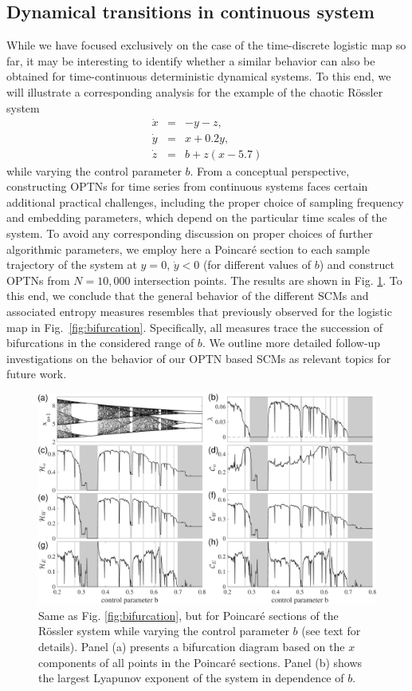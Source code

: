 \documentclass[12pt,aip,cha,reprint,nofootinbib]{revtex4-1}
\begin{document}
\subsection{Dynamical transitions in continuous system}\label{sec:cont}

While we have focused exclusively on the case of the time-discrete logistic map so far, it may be interesting to identify whether a similar behavior can also be obtained for time-continuous deterministic dynamical systems. To this end, we will illustrate a corresponding analysis for the example of the chaotic R\"ossler system \cite{Roessler1976} 
\begin{eqnarray}
\dot{x} &=& -y-z, \nonumber \\
\dot{y} &=& x+0.2y, \\
\dot{z} &=& b+z(x-5.7) \nonumber
\end{eqnarray}
while varying the control parameter $b$. From a conceptual perspective, constructing OPTNs for time series from continuous systems faces certain additional practical challenges, including the proper choice of sampling frequency and embedding parameters, which depend on the particular time scales of the system. To avoid any corresponding discussion on proper choices of further algorithmic parameters, we employ here a Poincar\'e section to each sample trajectory of the system at $y=0$, $\dot{y}<0$ (for different values of $b$) and construct OPTNs from $N = 10,000$ intersection points. The results are shown in Fig. \ref{fig:bifurRossler}. To this end, we conclude that the general behavior of the different SCMs and associated entropy measures resembles that previously observed for the logistic map in Fig.~\ref{fig:bifurcation}. Specifically, all measures trace the succession of bifurcations in the considered range of $b$. We outline more detailed follow-up investigations on the behavior of our OPTN based SCMs as relevant topics for future work.

\begin{figure}
	\centering 
	\includegraphics[width=2\columnwidth]{rosslerEntropy.pdf}
\caption{\small{Same as Fig. \ref{fig:bifurcation}, but for Poincar\'e sections of the R\"ossler system while varying the control parameter $b$ (see text for details). Panel (a) presents a bifurcation diagram based on the $x$ components of all points in the Poincar\'e sections. Panel (b) shows the largest Lyapunov exponent of the system in dependence of $b$.} \label{fig:bifurRossler}}
\end{figure}
\end{document}
